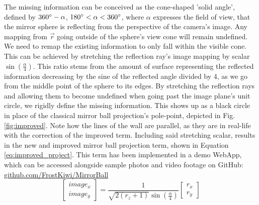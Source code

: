 \documentclass[10pt]{article}
\begin{document}
\begin{multicols}{2}
	The missing information can be conceived as the cone-shaped 'solid angle', defined by $360\degree -\alpha$, $180\degree<\alpha<360\degree$, where $\alpha$ expresses the field of view, that the mirror sphere is reflecting from the perspective of the camera's image. Any mapping from $\vec{r}$ going outside of the sphere's view cone will remain undefined. We need to remap the existing information to only fall within the visible cone. This can be achieved by stretching the reflection ray's image mapping by scalar $\sin{\left(\frac{\alpha}{4}\right)}$. This ratio stems from the amount of surface representing the reflected information decreasing by the sine of the reflected angle divided by 4, as we go from the middle point of the sphere to its edges. By stretching the reflection rays and allowing them to become undefined when going past the image plane's unit circle, we rigidly define the missing information. This shows up as a black circle in place of the classical mirror ball projection's pole-point, depicted in Fig. \ref{fig:improved}. Note how the lines of the wall are parallel, as they are in real-life with the correction of the improved term. Including said stretching scalar, results in the new and improved mirror ball projection term, shown in Equation \ref{eq:improved_project}. This term has been implemented in a demo WebApp, which can be accessed alongside sample photos and video footage on GitHub: \href{https://github.com/FrostKiwi/MirrorBall}{github.com/FrostKiwi/MirrorBall}
	\begin{equation}\label{eq:improved_project}
		\begin{bmatrix} image_x \\ image_y \end{bmatrix}=\frac{1}{\sqrt{2(r_z+1)}\sin{\left(\frac{\alpha}{4}\right)}}\begin{bmatrix} r_x \\ r_y \end{bmatrix}
	\end{equation}


\end{multicols}
\end{document}
